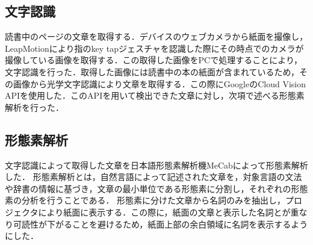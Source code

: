\subsection{文字認識}

読書中のページの文章を取得する．デバイスのウェブカメラから紙面を撮像し，LeapMotionにより指のkey tapジェスチャを認識した際にその時点でのカメラが撮像している画像を取得する．この取得した画像をPCで処理することにより，文字認識を行った．取得した画像には読書中の本の紙面が含まれているため，その画像から光学文字認識により文章を取得する．この際にGoogleのCloud Vision API\cite{google}を使用した．このAPIを用いて検出できた文章に対し，次項で述べる形態素解析を行った．

\subsection{形態素解析}

文字認識によって取得した文章を日本語形態素解析機MeCab\cite{mecab}によって形態素解析した．
形態素解析とは，自然言語によって記述された文章を，対象言語の文法や辞書の情報に基づき，文章の最小単位である形態素に分割し，それぞれの形態素の分析を行うことである．
形態素に分けた文章から名詞のみを抽出し，プロジェクタにより紙面に表示する．この際に，紙面の文章と表示した名詞とが重なり可読性が下がることを避けるため，紙面上部の余白領域に名詞を表示するようにした．

